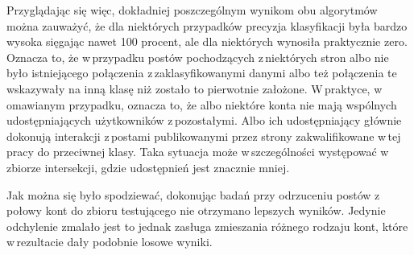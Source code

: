 \par
Przyglądając się więc, dokładniej poszczególnym wynikom obu algorytmów można zauważyć, że dla niektórych przypadków precyzja klasyfikacji była bardzo wysoka sięgając nawet 100 procent, ale dla niektórych wynosiła praktycznie zero. Oznacza to, że w\,przypadku postów pochodzących z\,niektórych stron albo nie było istniejącego połączenia z\,zaklasyfikowanymi danymi albo też połączenia te wskazywały na inną klasę niż zostało to pierwotnie założone. W\,praktyce, w\,omawianym przypadku, oznacza to, że albo niektóre konta nie mają wspólnych udostępniających użytkowników z\,pozostałymi. Albo ich udostępniający głównie dokonują interakcji z\,postami publikowanymi przez strony zakwalifikowane w\,tej pracy do przeciwnej klasy. Taka sytuacja może w\,szczególności występować w\,zbiorze intersekcji, gdzie udostępnień jest znacznie mniej. 
\par

Jak można się było spodziewać, dokonując badań przy odrzuceniu postów z\,połowy kont do zbioru testującego nie otrzymano lepszych wyników. Jedynie odchylenie zmalało jest to jednak zasługa zmieszania różnego rodzaju kont, które w\,rezultacie dały podobnie losowe wyniki. 

